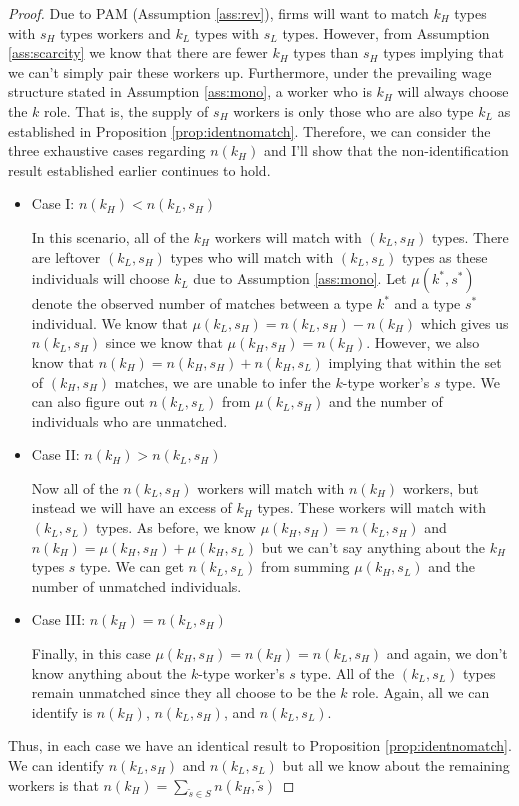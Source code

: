 \documentclass[12 pt]{article}
\begin{document}
\begin{proof}
	Due to PAM (Assumption \ref{ass:rev}), firms will want to match $k_H$ types with $s_H$ types workers and $k_L$ types with $s_L$ types. However, from Assumption \ref{ass:scarcity} we know that there are fewer $k_H$ types than $s_H$ types implying that we can't simply pair these workers up. Furthermore, under the prevailing wage structure stated in Assumption \ref{ass:mono}, a worker who is $k_H$ will always choose the $k$ role. That is, the supply of $s_H$ workers is only those who are also type $k_L$ as established in Proposition \ref{prop:identnomatch}. Therefore, we can consider the three exhaustive cases regarding $n(k_H)$ and I'll show that the non-identification result established earlier continues to hold. 
	\begin{itemize}
		\item Case I: $n(k_H) < n(k_L,s_H)$
		
		In this scenario, all of the $k_H$ workers will match with $(k_L,s_H)$ types. There are leftover $(k_L,s_H)$ types who will match with $(k_L,s_L)$ types as these individuals will choose $k_L$ due to Assumption \ref{ass:mono}. Let $\mu(k^*,s^*)$ denote the observed number of matches between a type $k^*$ and a type $s^*$ individual. We know that $\mu(k_L,s_H) = n(k_L,s_H)-n(k_H)$ which gives us $n(k_L,s_H)$ since we know that $\mu(k_H,s_H) = n(k_H)$. However, we also know that $n(k_H) = n(k_H,s_H) + n(k_H,s_L)$ implying that within the set of $(k_H,s_H)$ matches, we are unable to infer the $k$-type worker's $s$ type. We can also figure out $n(k_L,s_L)$ from $\mu(k_L,s_H)$ and the number of individuals who are unmatched. 
		
		\item Case II: $n(k_H) > n(k_L,s_H)$
		
		Now all of the $n(k_L,s_H)$ workers will match with $n(k_H)$ workers, but instead we will have an excess of $k_H$ types. These workers will match with $(k_L,s_L)$ types. As before, we know $\mu(k_H,s_H)=n(k_L,s_H)$ and $n(k_H) = \mu(k_H,s_H) + \mu(k_H,s_L)$ but we can't say anything about the $k_H$ types $s$ type. We can get $n(k_L,s_L)$ from summing $\mu(k_H,s_L)$ and the number of unmatched individuals.
		
		\item Case III: $n(k_H) = n(k_L,s_H)$
		
		Finally, in this case $\mu(k_H,s_H) = n(k_H) = n(k_L,s_H)$ and again, we don't know anything about the $k$-type worker's $s$ type. All of the $(k_L,s_L)$ types remain unmatched since they all choose to be the $k$ role. Again, all we can identify is $n(k_H)$, $n(k_L,s_H)$, and $n(k_L,s_L)$.
	\end{itemize}
	
	Thus, in each case we have an identical result to Proposition \ref{prop:identnomatch}. We can identify $n(k_L,s_H)$ and $n(k_L,s_L)$ but all we know about the remaining workers is that $n(k_H)=\sum_{\tilde{s}\in S}n(k_H,\tilde{s})$
	
\end{proof}
\end{document}
